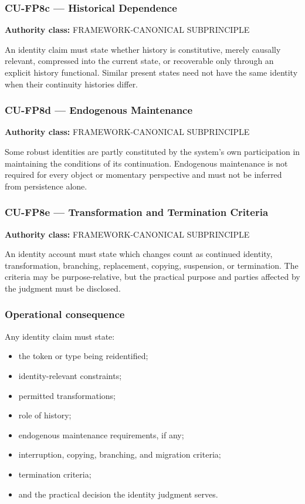 \documentclass[
  11pt,
]{article}
\providecommand{\tightlist}{%
  \setlength{\itemsep}{0pt}\setlength{\parskip}{0pt}}
\begin{document}
\subsubsection{CU-FP8c --- Historical
Dependence}\label{cu-fp8c-historical-dependence}

\textbf{Authority class:} FRAMEWORK-CANONICAL SUBPRINCIPLE

An identity claim must state whether history is constitutive, merely
causally relevant, compressed into the current state, or recoverable
only through an explicit history functional. Similar present states need
not have the same identity when their continuity histories differ.

\subsubsection{CU-FP8d --- Endogenous
Maintenance}\label{cu-fp8d-endogenous-maintenance}

\textbf{Authority class:} FRAMEWORK-CANONICAL SUBPRINCIPLE

Some robust identities are partly constituted by the system's own
participation in maintaining the conditions of its continuation.
Endogenous maintenance is not required for every object or momentary
perspective and must not be inferred from persistence alone.

\subsubsection{CU-FP8e --- Transformation and Termination
Criteria}\label{cu-fp8e-transformation-and-termination-criteria}

\textbf{Authority class:} FRAMEWORK-CANONICAL SUBPRINCIPLE

An identity account must state which changes count as continued
identity, transformation, branching, replacement, copying, suspension,
or termination. The criteria may be purpose-relative, but the practical
purpose and parties affected by the judgment must be disclosed.

\subsubsection{Operational consequence}\label{operational-consequence-7}

Any identity claim must state:

\begin{itemize}
\tightlist
\item
  the token or type being reidentified;
\item
  identity-relevant constraints;
\item
  permitted transformations;
\item
  role of history;
\item
  endogenous maintenance requirements, if any;
\item
  interruption, copying, branching, and migration criteria;
\item
  termination criteria;
\item
  and the practical decision the identity judgment serves.
\end{itemize}
\end{document}
